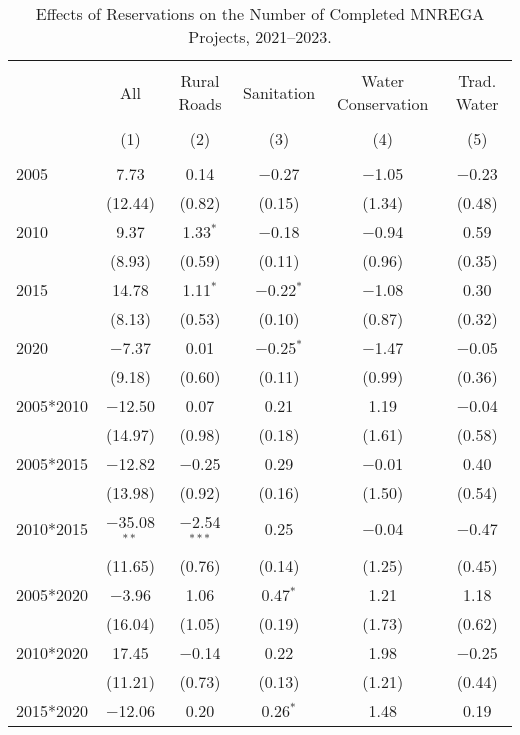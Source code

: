 \begin{table}[!htbp]
\centering
\begin{threeparttable}

  \caption{Effects of Reservations on the Number of Completed MNREGA Projects, 2021--2023.} 
  \label{main_mnrega_2011_2023_all} 
\scriptsize 
\begin{tabular}{@{\extracolsep{0pt}}lccccc} 
\\[-1.8ex]\hline 
\hline \\[-1.8ex] 
 & All & Rural Roads & Sanitation & Water Conservation & Trad. Water \\ 
\\[-1.8ex] & (1) & (2) & (3) & (4) & (5)\\ 
\hline \\[-1.8ex] 
 2005 & 7.73 & 0.14 & $-$0.27 & $-$1.05 & $-$0.23 \\ 
  & (12.44) & (0.82) & (0.15) & (1.34) & (0.48) \\ 
  2010 & 9.37 & 1.33$^{*}$ & $-$0.18 & $-$0.94 & 0.59 \\ 
  & (8.93) & (0.59) & (0.11) & (0.96) & (0.35) \\ 
  2015 & 14.78 & 1.11$^{*}$ & $-$0.22$^{*}$ & $-$1.08 & 0.30 \\ 
  & (8.13) & (0.53) & (0.10) & (0.87) & (0.32) \\ 
  2020 & $-$7.37 & 0.01 & $-$0.25$^{*}$ & $-$1.47 & $-$0.05 \\ 
  & (9.18) & (0.60) & (0.11) & (0.99) & (0.36) \\ 
  2005*2010 & $-$12.50 & 0.07 & 0.21 & 1.19 & $-$0.04 \\ 
  & (14.97) & (0.98) & (0.18) & (1.61) & (0.58) \\ 
  2005*2015 & $-$12.82 & $-$0.25 & 0.29 & $-$0.01 & 0.40 \\ 
  & (13.98) & (0.92) & (0.16) & (1.50) & (0.54) \\ 
  2010*2015 & $-$35.08$^{**}$ & $-$2.54$^{***}$ & 0.25 & $-$0.04 & $-$0.47 \\ 
  & (11.65) & (0.76) & (0.14) & (1.25) & (0.45) \\ 
  2005*2020 & $-$3.96 & 1.06 & 0.47$^{*}$ & 1.21 & 1.18 \\ 
  & (16.04) & (1.05) & (0.19) & (1.73) & (0.62) \\ 
  2010*2020 & 17.45 & $-$0.14 & 0.22 & 1.98 & $-$0.25 \\ 
  & (11.21) & (0.73) & (0.13) & (1.21) & (0.44) \\ 
  2015*2020 & $-$12.06 & 0.20 & 0.26$^{*}$ & 1.48 & 0.19 \\ 

\end{tabular}
\end{threeparttable}
\end{table}
